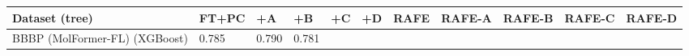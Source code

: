 \documentclass[
  10pt,
]{article}
\begin{document}
\begin{longtable}[]{@{}lllllllllll@{}}
\toprule
\begin{minipage}[b]{0.07\columnwidth}\raggedright
Dataset (tree)\strut
\end{minipage} & \begin{minipage}[b]{0.07\columnwidth}\raggedright
FT+PC\strut
\end{minipage} & \begin{minipage}[b]{0.07\columnwidth}\raggedright
+A\strut
\end{minipage} & \begin{minipage}[b]{0.07\columnwidth}\raggedright
+B\strut
\end{minipage} & \begin{minipage}[b]{0.07\columnwidth}\raggedright
+C\strut
\end{minipage} & \begin{minipage}[b]{0.07\columnwidth}\raggedright
+D\strut
\end{minipage} & \begin{minipage}[b]{0.07\columnwidth}\raggedright
RAFE\strut
\end{minipage} & \begin{minipage}[b]{0.07\columnwidth}\raggedright
RAFE-A\strut
\end{minipage} & \begin{minipage}[b]{0.07\columnwidth}\raggedright
RAFE-B\strut
\end{minipage} & \begin{minipage}[b]{0.07\columnwidth}\raggedright
RAFE-C\strut
\end{minipage} & \begin{minipage}[b]{0.07\columnwidth}\raggedright
RAFE-D\strut
\end{minipage}\tabularnewline
\midrule
\endhead
\begin{minipage}[t]{0.07\columnwidth}\raggedright
BBBP (MolFormer-FL) (XGBoost)\strut
\end{minipage} & \begin{minipage}[t]{0.07\columnwidth}\raggedright
0.785\strut
\end{minipage} & \begin{minipage}[t]{0.07\columnwidth}\raggedright
0.790\strut
\end{minipage} & \begin{minipage}[t]{0.07\columnwidth}\raggedright
0.781\strut
\end{minipage} & \begin{minipage}[t]{0.07\columnwidth}\raggedright

\end{minipage}
\end{longtable}
\end{document}
